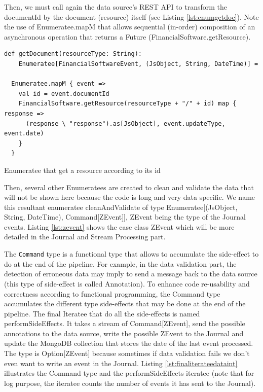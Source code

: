 Then, we must call again the data source's REST API to transform the documentId by the document (resource) itself (see Listing \ref{lst:enumgetdoc}).
Note the use of Enumeratee.mapM that allows sequential (in-order) composition of an asynchronous operation that returns a Future (FinancialSoftware.getResource).

\begin{listing}[h]
\begin{verbatim}
def getDocument(resourceType: String): 
    Enumeratee[FinancialSoftwareEvent, (JsObject, String, DateTime)] =

  Enumeratee.mapM { event =>
    val id = event.documentId
    FinancialSoftware.getResource(resourceType + "/" + id) map { response =>
      (response \ "response").as[JsObject], event.updateType, event.date)
    }
  }
\end{verbatim}
\caption{Enumeratee that get a resource according to its id}
\label{lst:enumgetdoc}
\end{listing}

Then, several other Enumeratees are created to clean and validate the data that will not be shown here because the code is long and very data specific.
We name this resultant enumeratee cleanAndValidate of type Enumeratee[(JsObject, String, DateTime), Command[ZEvent]], ZEvent being the type of the Journal events. 
Listing \ref{lst:zevent} shows the case class ZEvent which will be more detailed in the Journal and Stream Processing part. 

The \verb|Command| type is a functional type that allows to accumulate the side-effect to do at the end of the pipeline. For example, in the data validation part, the
detection of erroneous data may imply to send a message back to the data source (this type of side-effect is called Annotation). To enhance code re-usability and correctness according to functional programming, the Command type accumulates the different type side-effects that may be done at the end of the pipeline. The final Iteratee that do all the side-effects
is named performSideEffects. It takes a stream of Command[ZEvent], send the possible annotations to the data source, write the possible ZEvent to the Journal and update
the MongoDB collection that stores the date of the last event processed. The type is
Option[ZEvent] because sometimes if data validation fails we don't even want to write an event in the Journal. Listing \ref{lst:finaliterateedataint} illustrates the Command
type and the performSideEffects iteratee (note that for log purpose, the iteratee counts the number of events it has sent to the Journal).

